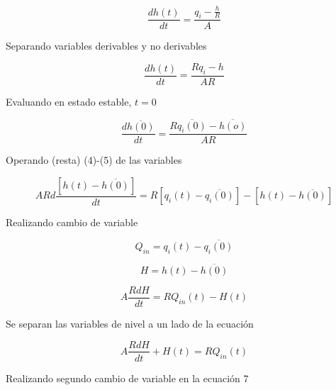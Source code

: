 \documentclass[a4paper,12pt,twoside]{proyectotanquesecci}
\begin{document}
\begin{equation}
\frac {dh\left( t\right) }{dt}=\frac {q_{i}-\frac {h}{R}}{A}
\end{equation}

Separando variables derivables y no derivables

\begin{equation}
\frac {dh\left( t\right) }{dt}=\frac {Rq_{i}-h}{AR}
\end{equation}

Evaluando en estado estable, $t=0$

\begin{equation}
\frac {d\overline {h\left( 0\right) }}{dt}=\frac {R\overline {q_{i}\left( 0\right) }-\overline {h\left( o\right) }}{AR}
\end{equation}

Operando (resta) (4)-(5) de las variables


\begin{equation}
ARd\frac {\left[ h\left( t\right) -\overline {h\left( 0\right) }\right] }{dt}=R\left[ q_{i}\left( t\right) -\overline {q_{i}\left( 0\right) }\right] -\left[ h\left( t\right) -\overline {h\left( 0\right) }\right]
\end{equation}

Realizando cambio de variable

\begin{equation}
Q_{in}=q_{i}\left( t\right) -\overline {q_{i}\left( 0\right) }
\end{equation}

\begin{equation}
H=h\left( t\right) -\overline {h\left( 0\right) }
\end{equation}

\begin{equation}
A\frac {RdH}{dt}=RQ_{in}\left( t\right) -H\left( t\right)
\end{equation}

Se separan las variables de nivel a un lado de la ecuación

\begin{equation}
A\frac {RdH}{dt}+H\left( t\right) =RQ_{in}\left( t\right)
\end{equation}

Realizando segundo cambio de variable en la ecuación 7 \\
\end{document}
